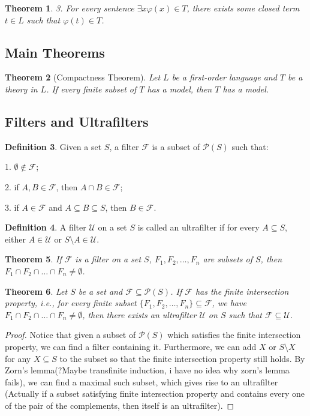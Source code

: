 \documentclass[12pt, reqno]{amsart}
\newtheorem{theorem}{Theorem}[section]
\theoremstyle{definition}
\newtheorem{definition}[theorem]{Definition}
\theoremstyle{remark}
\numberwithin{equation}{section}
\begin{document}
{\begin{theorem}
    3. For every sentence $\exists x \varphi(x) \in T$, there exists some closed term $t\in L$ such that $\varphi(t) \in T$.


\end{theorem}
\subsection{Main Theorems}

\begin{theorem}[Compactness Theorem]
    Let $L$ be a first-order language and $T$ be a theory in $L$. If every finite subset of $T$ has a model, then $T$ has a model.
\end{theorem}

\subsection{Filters and Ultrafilters}

\begin{definition}
    Given a set $S$, a filter $\mathcal{F}$ is a subset of $\mathcal{P}(S)$ such that:

    1. $\emptyset \notin \mathcal{F}$;

    2. if $A, B \in \mathcal{F}$, then $A \cap B \in \mathcal{F}$;

    3. if $A \in \mathcal{F}$ and $A \subseteq B \subseteq S$, then $B \in \mathcal{F}$.
\end{definition}

\begin{definition}
    A filter $\mathcal{U}$ on a set $S$ is called an ultrafilter if for every $A \subseteq S$, either $A \in \mathcal{U}$ or $S \setminus A \in \mathcal{U}$.
\end{definition}

\begin{theorem}
    If $\mathcal{F}$ is a filter on a set $S$, $F_1, F_2, \ldots, F_n$ are subsets of $S$, then $F_1 \cap F_2 \cap \ldots \cap F_n \neq \emptyset$.
\end{theorem}

\begin{theorem}
    Let $S$ be a set and $\mathcal{F}\subseteq \mathcal{P}(S)$. If $\mathcal{F}$ has the finite intersection property, i.e., for every finite subset $\{F_1, F_2, \ldots, F_n\} \subseteq \mathcal{F}$, we have $F_1 \cap F_2 \cap \ldots \cap F_n \neq \emptyset$, then there exists an ultrafilter $\mathcal{U}$ on $S$ such that $\mathcal{F} \subseteq \mathcal{U}$.
\end{theorem}
\begin{proof}
    Notice that given a subset of $\mathcal{P}(S)$ which satisfies the finite intersection property, we can find a filter containing it. Furthermore, we can add $X$ or $S\setminus X$ for any $X\subseteq S$ to the subset so that the finite intersection property still holds. By Zorn's lemma(?Maybe transfinite induction, i have no idea why zorn's lemma fails), we can find a maximal such subset, which gives rise to an ultrafilter (Actually if a subset satisfying finite intersection property and contains every one of the pair of the complements, then itself is an ultrafilter).
\end{proof}

}
\end{document}
